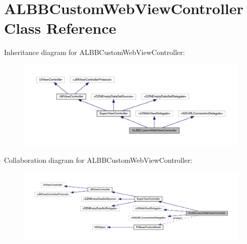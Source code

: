 \hypertarget{interface_a_l_b_b_custom_web_view_controller}{}\section{A\+L\+B\+B\+Custom\+Web\+View\+Controller Class Reference}
\label{interface_a_l_b_b_custom_web_view_controller}


Inheritance diagram for A\+L\+B\+B\+Custom\+Web\+View\+Controller\+:\nopagebreak
\begin{figure}[H]
\begin{center}
\leavevmode
\includegraphics[width=350pt]{interface_a_l_b_b_custom_web_view_controller__inherit__graph}
\end{center}
\end{figure}


Collaboration diagram for A\+L\+B\+B\+Custom\+Web\+View\+Controller\+:\nopagebreak
\begin{figure}[H]
\begin{center}
\leavevmode
\includegraphics[width=350pt]{interface_a_l_b_b_custom_web_view_controller__coll__graph}
\end{center}
\end{figure}
